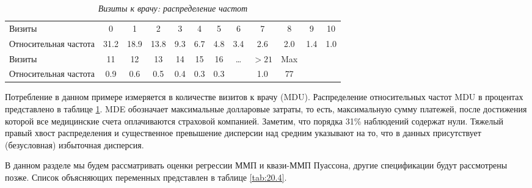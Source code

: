     \begin{table}[!htbp]\caption{\textit{Визиты к врачу: распределение частот}}\label{tab:20.3}
    \begin{center}
\begin{tabular}{lccccccccccc}
\hline \hline
Визиты                  &0&1&2&3&4&5&6&7&8&9&10\\
Относительная частота   &31.2&18.9&13.8&9.3&6.7&4.8&3.4&2.6&2.0&1.4&1.0\\
\hline
Визиты                  &11&12&13&14&15&16&\ldots &$>21$& Max&&\\
Относительная частота   &0.9&0.6&0.5&0.4&0.3&0.3& &1.0&77&&\\
\hline \hline
\end{tabular}
    \end{center}
    \end{table}

Потребление в данном примере измеряется в количестве визитов к врачу (MDU). Распределение относительных частот MDU в процентах представлено в таблице \ref{tab:20.3}. MDE обозначает максимальные долларовые затраты, то есть, максимальную сумму платежей, после достижения которой все медицинские счета оплачиваются страховой компанией. Заметим, что порядка 31\% наблюдений содержат нули. Тяжелый правый хвост распределения и существенное превышение дисперсии над средним указывают на то, что в данных присутствует (безусловная) избыточная дисперсия.

В данном разделе мы будем рассматривать оценки регрессии ММП и квази-ММП Пуассона, другие спецификации будут рассмотрены позже. Список объясняющих переменных представлен в таблице \ref{tab:20.4}.

